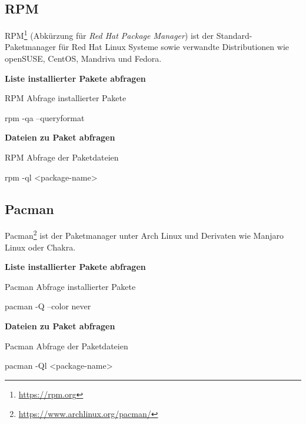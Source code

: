 \subsection{RPM}

RPM\footnote{\url{https://rpm.org}} (Abkürzung für \textit{Red Hat Package
Manager}) ist der Standard-Paketmanager für Red Hat Linux Systeme sowie
verwandte Distributionen wie openSUSE, CentOS, Mandriva und Fedora.

\textbf{Liste installierter Pakete abfragen}

\begin{listing}
\caption{RPM Abfrage installierter Pakete}
\begin{bashcode}
rpm -qa --queryformat %
\end{bashcode}
\end{listing}

\textbf{Dateien zu Paket abfragen}

\begin{listing}
\caption{RPM Abfrage der Paketdateien}
\begin{bashcode}
rpm -ql <package-name>
\end{bashcode}
\end{listing}


\subsection{Pacman}

Pacman\footnote{\url{https://www.archlinux.org/pacman/}} ist der Paketmanager
unter Arch Linux und Derivaten wie Manjaro Linux oder Chakra.

\textbf{Liste installierter Pakete abfragen}

\begin{listing}
\caption{Pacman Abfrage installierter Pakete}
\begin{bashcode}
pacman -Q --color never
\end{bashcode}
\end{listing}

\textbf{Dateien zu Paket abfragen}

\begin{listing}
\caption{Pacman Abfrage der Paketdateien}
\begin{bashcode}
pacman -Ql <package-name>
\end{bashcode}
\end{listing}



